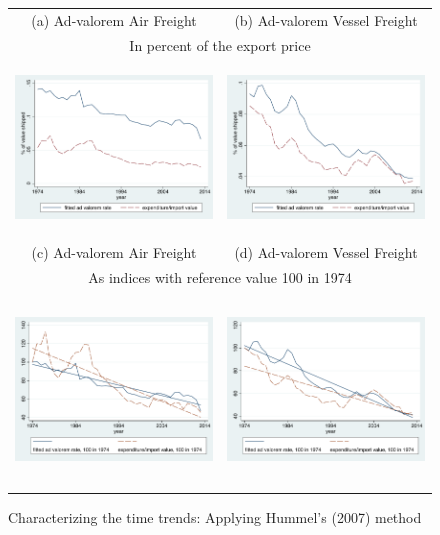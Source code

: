 \documentclass[a4paper,11pt]{article}
\begin{document}
\begin{figure}[htbp]
\caption{Characterizing the time trends: Applying Hummel's (2007) method }
\label{fig:comp_effects_as_in_Hummels}
\begin{center}
\begin{tabular}{cc}
{\small (a) Ad-valorem Air Freight} & {\small (b) Ad-valorem Vessel Freight}\\
\multicolumn{2}{c}{{\small In percent of the export price}} \\
\includegraphics[width=2.5in, height=1.8in]{figure5_comme_hummels.pdf}
& \includegraphics[width=2.5in,height=1.8in]{figure6_comme_hummels.pdf} \\
{\small (c) Ad-valorem Air Freight} & {\small (d) Ad-valorem Vessel Freight}\\
\multicolumn{2}{c}{{\small As indices with reference value 100 in 1974} }\\
\includegraphics[width=2.5in, height=2in]{figure5_comme_hummels_base100.pdf}
& \includegraphics[width=2.5in,height=2in]{figure6_comme_hummels_base100.pdf} \\
\end{tabular}
\end{center}
\end{figure}
\end{document}
